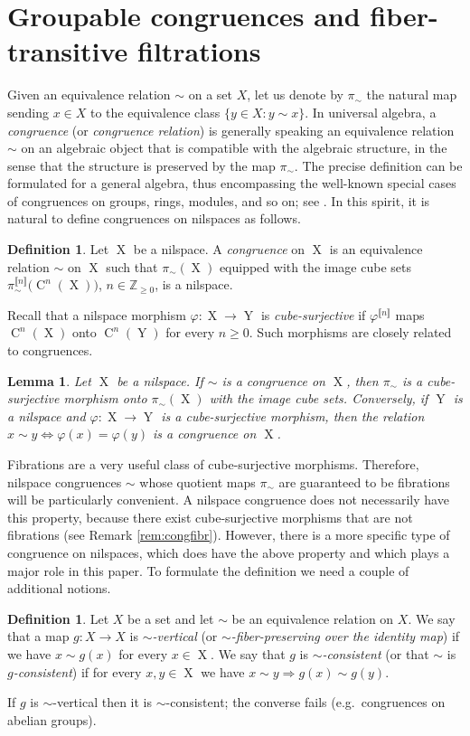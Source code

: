 \documentclass[a4paper,12pt,reqno]{amsart}
\newtheorem{lemma}[theorem]{Lemma}
\theoremstyle{definition}
\newtheorem{defn}[theorem]{Definition}
\def\to{\rightarrow}
\newcommand*{\db}[1]{\llbracket #1\rrbracket}
\newcommand{\mb}{\mathbb}
\DeclareMathOperator{\ns}{X}
\DeclareMathOperator{\nss}{Y}
\DeclareMathOperator{\cu}{C}
\begin{document}
\section{Groupable congruences and fiber-transitive filtrations}\label{sec:gpcongs}
\noindent Given an equivalence relation $\sim$ on a set $X$, let us denote by $\pi_\sim$ the natural map sending $x\in X$ to the equivalence class $\{y\in X: y\sim x\}$. In universal algebra, a \emph{congruence} (or \emph{congruence relation}) is generally speaking an equivalence relation $\sim$ on an algebraic object that is compatible with the algebraic structure, in the sense that the structure is preserved by the map $\pi_\sim$. The precise definition can be formulated for a general algebra, thus encompassing the well-known special cases of congruences on groups, rings, modules, and so on; see \cite[Definition 1.19]{Bergman}. In this spirit, it is natural to define congruences on nilspaces as follows.

\begin{defn}\label{def:cong} 
Let $\ns$ be a nilspace. A \emph{congruence} on $\ns$ is an equivalence relation $\sim$ on $\ns$ such that  $\pi_{\sim}(\ns)$ equipped with the image cube sets $\pi_{\sim}^{\db{n}}\big(\! \cu^n(\ns)\big)$, $n\in\mb{Z}_{\geq 0}$, is a nilspace.
\end{defn}
\noindent Recall that a nilspace morphism $\varphi:\ns\to\nss$ is \emph{cube-surjective} if $\varphi^{\db{n}}$ maps $\cu^n(\ns)$ onto $\cu^n(\nss)$ for every $n\geq 0$. Such morphisms are closely related to congruences.
\begin{lemma}
Let $\ns$ be a nilspace. If $\sim$ is a congruence on $\ns$, then $\pi_\sim$ is a cube-surjective morphism onto $\pi_{\sim}(\ns)$ with the image cube sets. Conversely, if $\nss$ is a nilspace and $\varphi:\ns\to\nss$ is a cube-surjective morphism, then the  relation $x\sim y \Leftrightarrow \varphi(x)=\varphi(y)$ is a congruence on $\ns$.
\end{lemma}
\noindent Fibrations are a very useful class of cube-surjective morphisms. Therefore, nilspace congruences $\sim$ whose quotient maps $\pi_\sim$ are guaranteed to be fibrations will be particularly convenient. A nilspace congruence does not necessarily have this property, because there exist cube-surjective morphisms that are not fibrations (see Remark \ref{rem:congfibr}). However, there is a more specific type of congruence on nilspaces, which does have the above property and which plays a major role in this paper. To formulate the definition we need a couple of additional notions.
\begin{defn}
Let $X$ be a set and let $\sim$ be an equivalence relation on $X$. We say that a map $g:X\to X$ is \emph{$\sim$-vertical} (or \emph{$\sim$-fiber-preserving over the identity map}) if we have $x\sim g(x)$ for every $x\in \ns$. We say that $g$ is \emph{$\sim$-consistent} (or that $\sim$ is \emph{$g$-consistent}) if for every $x,y\in \ns$ we have $x\sim y \Rightarrow g(x)\sim g(y)$.
\end{defn}
\noindent If $g$ is $\sim$-vertical then it is $\sim$-consistent; the converse  fails (e.g.\ congruences on abelian groups).
\end{document}
